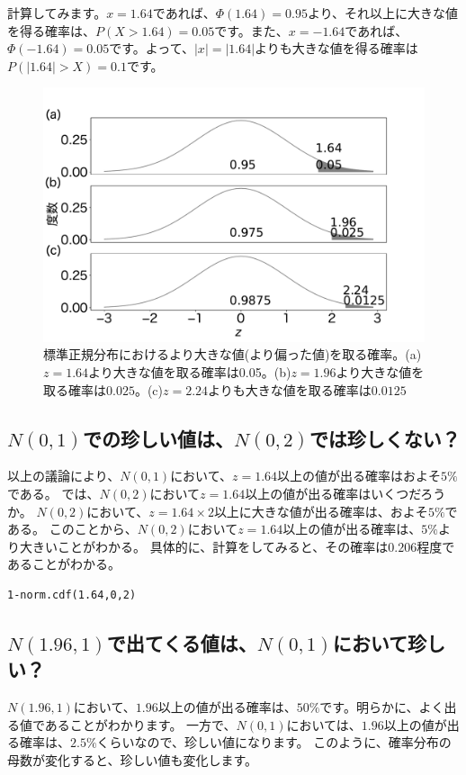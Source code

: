 計算してみます。$x=1.64$であれば、$\varPhi(1.64)=0.95$より、それ以上に大きな値を得る確率は、$P(X>1.64)=0.05$です。また、$x=-1.64$であれば、$\varPhi(-1.64)=0.05$です。よって、$|x|=|1.64|$よりも大きな値を得る確率は$P(|1.64|>X)=0.1$です。


\begin{figure}
    \begin{center}
        \includegraphics[width=15cm]{./image/02_/z_value_larger.pdf}
        \caption{標準正規分布におけるより大きな値(より偏った値)を取る確率。(a)$z=1.64$より大きな値を取る確率は0.05。(b)$z=1.96$より大きな値を取る確率は$0.025$。(c)$z=2.24$よりも大きな値を取る確率は$0.0125$}
        \label{fig:z_value_larger}
      \end{center}
    \end{figure}

\subsection{$N(0,1)$での珍しい値は、$N(0,2)$では珍しくない？}
以上の議論により、$N(0,1)$において、$z=1.64$以上の値が出る確率はおよそ$5\%$である。
では、$N(0,2)$において$z=1.64$以上の値が出る確率はいくつだろうか。
$N(0,2)$において、$z=1.64\times2$以上に大きな値が出る確率は、およそ$5\%$である。
このことから、$N(0,2)$において$z=1.64$以上の値が出る確率は、$5\%$より大きいことがわかる。
具体的に、計算をしてみると、その確率は$0.206$程度であることがわかる。
\begin{lstlisting}
1-norm.cdf(1.64,0,2)
\end{lstlisting}

\subsection{$N(1.96,1)$で出てくる値は、$N(0,1)$において珍しい？}
$N(1.96,1)$において、$1.96$以上の値が出る確率は、$50\%$です。明らかに、よく出る値であることがわかります。
一方で、$N(0,1)$においては、$1.96$以上の値が出る確率は、$2.5\%$くらいなので、珍しい値になります。
このように、確率分布の母数が変化すると、珍しい値も変化します。




